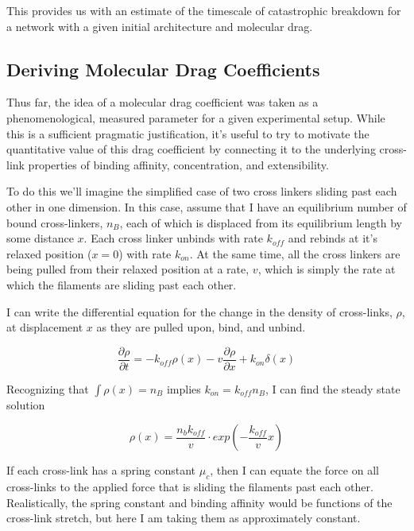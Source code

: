This provides us with an estimate of the timescale of catastrophic breakdown for a network with a given initial architecture and molecular drag.



\subsection{Deriving Molecular Drag Coefficients}
\label{app:drag}
Thus far, the idea of a molecular drag coefficient was taken as a phenomenological, measured parameter for a given experimental setup.  While this is a sufficient pragmatic justification, it's useful to try to motivate the quantitative value of this drag coefficient by connecting it to the underlying cross-link properties of binding affinity, concentration, and extensibility.

To do this we'll imagine the simplified case of two cross linkers sliding past each other in one dimension.  In this case, assume that I have an equilibrium number of bound cross-linkers, $n_B$, each of which is displaced from its equilibrium length by some distance $x$.  Each cross linker unbinds with rate $k_{off}$ and rebinds at it's relaxed position ($x=0$) with rate $k_{on}$.  At the same time, all the cross linkers are being pulled from their relaxed position at a rate, $v$, which is simply the rate at which the filaments are sliding past each other.  

I can write the differential equation for the change in the density of cross-links, $\rho$, at displacement $x$ as they are pulled upon, bind, and unbind.

\begin{equation}
\frac{\partial \rho}{\partial t} = -k_{off}\rho(x) - v\frac{\partial \rho}{\partial x} + k_{on}\delta(x)
\end{equation}

Recognizing that $\int \rho(x)=n_B$ implies $k_{on}=k_{off}n_B$, I can find the steady state solution

\begin{equation}
\rho(x) = \frac{n_b k_{off}}{v}\cdot exp\left ( -\frac{k_{off}}{v}x \right )
\end{equation}

If each cross-link has a spring constant $\mu_c$, then I can equate the force on all cross-links to the applied force that is sliding the filaments past each other.  Realistically, the spring constant and binding affinity would be functions of the cross-link stretch, but here I am taking them as approximately constant.  


